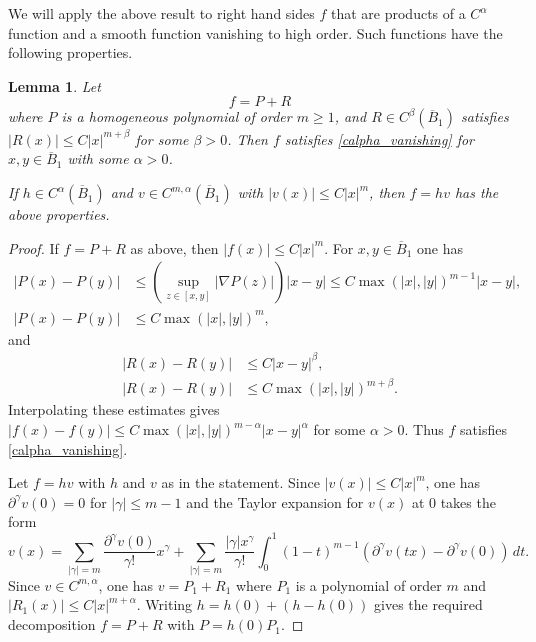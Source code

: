 \documentclass[11pt,a4paper]{amsart}
\newtheorem{Lemma}[Theorem]{Lemma}
\theoremstyle{definition}
\numberwithin{equation}{section}
\newcommand{\abs}[1]{\lvert #1 \rvert}          %
\newcommand{\ol}[1]{\overline{#1}}
\newcommand{\p}{\partial}
\begin{document}
We will apply the above result to right hand sides $f$ that are products of a $C^{\alpha}$ function and a smooth function vanishing to high order. Such functions have the following properties.

\begin{Lemma} \label{lemma_product_vanishing}
Let 
\[
f = P + R
\]
where $P$ is a homogeneous polynomial of order $m \geq 1$, and $R \in C^{\beta}(\ol{B}_1)$ satisfies $|R(x)| \leq C |x|^{m+\beta}$ for some $\beta > 0$. Then $f$ satisfies \eqref{calpha_vanishing} for $x, y \in \ol{B}_1$ with some $\alpha > 0$.

If $h \in C^{\alpha}(\ol{B}_1)$ and $v \in C^{m,\alpha}(\ol{B}_1)$ with $|v(x)| \leq C |x|^m$, then $f = hv$ has the above properties.
\end{Lemma}
\begin{proof}
If $f = P+R$ as above, then $|f(x)| \leq C |x|^m$. For $x, y \in \ol{B}_1$ one has 
\begin{align*}
|P(x)-P(y)| &\leq (\sup_{z \in [x,y]} |\nabla P(z)|) |x-y| \leq C \max(|x|,|y|)^{m-1} |x-y|, \\
|P(x)-P(y)| &\leq C \max(|x|,|y|)^m,
\end{align*}
and 
\begin{align*}
|R(x)-R(y)| &\leq C|x-y|^{\beta}, \\
|R(x)-R(y)| &\leq C \max(|x|,|y|)^{m+\beta}.
\end{align*}
Interpolating these estimates gives $|f(x)-f(y)| \leq C \max(|x|,|y|)^{m-\alpha} |x-y|^{\alpha}$ for some $\alpha > 0$. Thus $f$ satisfies \eqref{calpha_vanishing}.

Let $f = hv$ with $h$ and $v$ as in the statement. Since $\abs{v(x)} \leq C \abs{x}^m$, one has $\p^{\gamma} v(0) = 0$ for $\abs{\gamma} \leq m-1$ and the Taylor expansion for $v(x)$ at $0$ takes the form 
\[
v(x) = \sum_{\abs{\gamma} = m} \frac{\p^{\gamma} v(0)}{\gamma!} x^{\gamma} + \sum_{\abs{\gamma} = m} \frac{\abs{\gamma} x^{\gamma}}{\gamma!} \int_0^1 (1-t)^{m-1} (\p^{\gamma} v(tx) - \p^{\gamma} v(0)) \,dt.
\]
Since $v \in C^{m,\alpha}$, one has $v = P_1+R_1$ where $P_1$ is a polynomial of order $m$ and $|R_1(x)| \leq C |x|^{m+\alpha}$. Writing $h = h(0) + (h - h(0))$ gives the required decomposition $f = P + R$ with $P = h(0) P_1$.
\end{proof}
\end{document}

